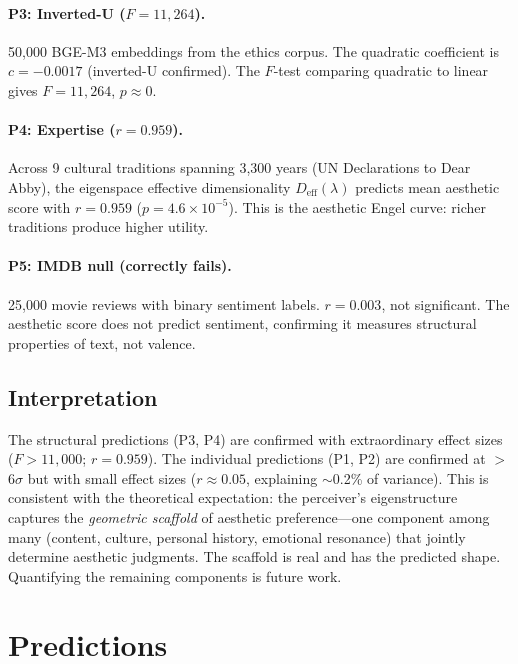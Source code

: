 \documentclass[journal]{IEEEtran}
\theoremstyle{definition}
\theoremstyle{remark}
\begin{document}
\paragraph{P3: Inverted-U ($F = 11{,}264$).}
50{,}000 BGE-M3 embeddings from the ethics corpus.  The quadratic
coefficient is $c = -0.0017$ (inverted-U confirmed).  The $F$-test
comparing quadratic to linear gives $F = 11{,}264$, $p \approx 0$.

\paragraph{P4: Expertise ($r = 0.959$).}
Across 9 cultural traditions spanning 3{,}300 years (UN Declarations
to Dear Abby), the eigenspace effective dimensionality
$D_{\mathrm{eff}}(\lambda)$ predicts mean aesthetic score with
$r = 0.959$ ($p = 4.6 \times 10^{-5}$).  This is the aesthetic
Engel curve: richer traditions produce higher utility.

\paragraph{P5: IMDB null (correctly fails).}
25{,}000 movie reviews with binary sentiment labels.  $r = 0.003$,
not significant.  The aesthetic score does not predict sentiment,
confirming it measures structural properties of text, not valence.

\subsection{Interpretation}

The structural predictions (P3, P4) are confirmed with extraordinary
effect sizes ($F > 11{,}000$; $r = 0.959$).  The individual
predictions (P1, P2) are confirmed at $>$$6\sigma$ but with small
effect sizes ($r \approx 0.05$, explaining $\sim$0.2\% of variance).
This is consistent with the theoretical expectation: the perceiver's
eigenstructure captures the \emph{geometric scaffold} of aesthetic
preference---one component among many (content, culture, personal
history, emotional resonance) that jointly determine aesthetic
judgments.  The scaffold is real and has the predicted shape.
Quantifying the remaining components is future work.


\section{Predictions}
\label{sec:predictions}
\end{document}
